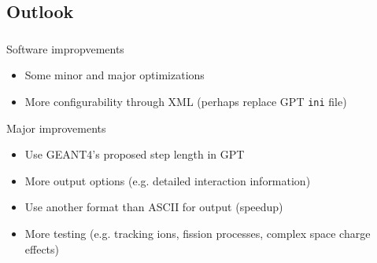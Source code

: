 \documentclass{beamer}
\newcommand{\ident}{\thesection.\thesubsection}
\newcommand{\mysubsection}[1]{\subsection{#1}\label{\ident}}
\newcommand{\ftitle}{\frametitle{\nameref{\ident}}}
\newcommand{\geantws}{G{\smaller EANT}4}
\begin{document}
\mysubsection{Outlook}

\begin{frame}
	\ftitle
	\begin{block}{Software impropvements}
		\begin{itemize}
			\item Some minor and major optimizations
			\item More configurability through XML (perhaps replace GPT \texttt{ini} file)
		\end{itemize}
	\end{block}
	\pause
	\begin{exampleblock}{Major improvements}
		\begin{itemize}
			\item Use \geantws's proposed step length in GPT
			\item More output options (e.g. detailed interaction information)
			\item Use another format than ASCII for output (speedup)
			\item More testing (e.g. tracking ions, fission processes, complex space charge effects)
		\end{itemize}
	\end{exampleblock}
\end{frame}
\end{document}
